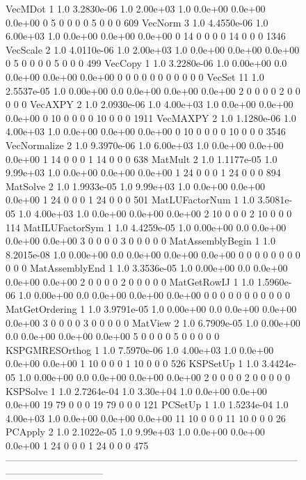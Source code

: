 \begin{figure}[H]
{\begin{outputlisting}[\fontsize{7.5pt}{8pt}\ttfamily]
VecMDot                1 1.0 3.2830e-06 1.0 2.00e+03 1.0 0.0e+00 0.0e+00 0.0e+00  0  5  0  0  0   0  5  0  0  0   609
VecNorm                3 1.0 4.4550e-06 1.0 6.00e+03 1.0 0.0e+00 0.0e+00 0.0e+00  0 14  0  0  0   0 14  0  0  0  1346
VecScale               2 1.0 4.0110e-06 1.0 2.00e+03 1.0 0.0e+00 0.0e+00 0.0e+00  0  5  0  0  0   0  5  0  0  0   499
VecCopy                1 1.0 3.2280e-06 1.0 0.00e+00 0.0 0.0e+00 0.0e+00 0.0e+00  0  0  0  0  0   0  0  0  0  0     0
VecSet                11 1.0 2.5537e-05 1.0 0.00e+00 0.0 0.0e+00 0.0e+00 0.0e+00  2  0  0  0  0   2  0  0  0  0     0
VecAXPY                2 1.0 2.0930e-06 1.0 4.00e+03 1.0 0.0e+00 0.0e+00 0.0e+00  0 10  0  0  0   0 10  0  0  0  1911
VecMAXPY               2 1.0 1.1280e-06 1.0 4.00e+03 1.0 0.0e+00 0.0e+00 0.0e+00  0 10  0  0  0   0 10  0  0  0  3546
VecNormalize           2 1.0 9.3970e-06 1.0 6.00e+03 1.0 0.0e+00 0.0e+00 0.0e+00  1 14  0  0  0   1 14  0  0  0   638
MatMult                2 1.0 1.1177e-05 1.0 9.99e+03 1.0 0.0e+00 0.0e+00 0.0e+00  1 24  0  0  0   1 24  0  0  0   894
MatSolve               2 1.0 1.9933e-05 1.0 9.99e+03 1.0 0.0e+00 0.0e+00 0.0e+00  1 24  0  0  0   1 24  0  0  0   501
MatLUFactorNum         1 1.0 3.5081e-05 1.0 4.00e+03 1.0 0.0e+00 0.0e+00 0.0e+00  2 10  0  0  0   2 10  0  0  0   114
MatILUFactorSym        1 1.0 4.4259e-05 1.0 0.00e+00 0.0 0.0e+00 0.0e+00 0.0e+00  3  0  0  0  0   3  0  0  0  0     0
MatAssemblyBegin       1 1.0 8.2015e-08 1.0 0.00e+00 0.0 0.0e+00 0.0e+00 0.0e+00  0  0  0  0  0   0  0  0  0  0     0
MatAssemblyEnd         1 1.0 3.3536e-05 1.0 0.00e+00 0.0 0.0e+00 0.0e+00 0.0e+00  2  0  0  0  0   2  0  0  0  0     0
MatGetRowIJ            1 1.0 1.5960e-06 1.0 0.00e+00 0.0 0.0e+00 0.0e+00 0.0e+00  0  0  0  0  0   0  0  0  0  0     0
MatGetOrdering         1 1.0 3.9791e-05 1.0 0.00e+00 0.0 0.0e+00 0.0e+00 0.0e+00  3  0  0  0  0   3  0  0  0  0     0
MatView                2 1.0 6.7909e-05 1.0 0.00e+00 0.0 0.0e+00 0.0e+00 0.0e+00  5  0  0  0  0   5  0  0  0  0     0
KSPGMRESOrthog         1 1.0 7.5970e-06 1.0 4.00e+03 1.0 0.0e+00 0.0e+00 0.0e+00  1 10  0  0  0   1 10  0  0  0   526
KSPSetUp               1 1.0 3.4424e-05 1.0 0.00e+00 0.0 0.0e+00 0.0e+00 0.0e+00  2  0  0  0  0   2  0  0  0  0     0
KSPSolve               1 1.0 2.7264e-04 1.0 3.30e+04 1.0 0.0e+00 0.0e+00 0.0e+00 19 79  0  0  0  19 79  0  0  0   121
PCSetUp                1 1.0 1.5234e-04 1.0 4.00e+03 1.0 0.0e+00 0.0e+00 0.0e+00 11 10  0  0  0  11 10  0  0  0    26
PCApply                2 1.0 2.1022e-05 1.0 9.99e+03 1.0 0.0e+00 0.0e+00 0.0e+00  1 24  0  0  0   1 24  0  0  0   475
------------------------------------------------------------------------------------------------------------------------


\end{outputlisting}}
\end{figure}
